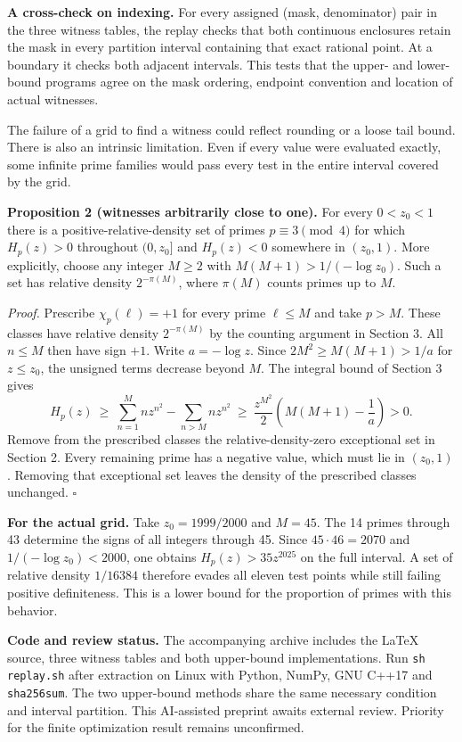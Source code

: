 \documentclass[11pt]{article}
\newcommand{\sechead}[1]{\medskip{\large\bfseries #1}\par}
\begin{document}
\textbf{A cross-check on indexing.} For every assigned (mask, denominator) pair in the three witness tables, the replay checks that both continuous enclosures retain the mask in every partition interval containing that exact rational point. At a boundary it checks both adjacent intervals. This tests that the upper- and lower-bound programs agree on the mask ordering, endpoint convention and location of actual witnesses.
\newpage
\sechead{7. How far out can the first negative witness lie?}
The failure of a grid to find a witness could reflect rounding or a loose tail bound. There is also an intrinsic limitation. Even if every value were evaluated exactly, some infinite prime families would pass every test in the entire interval covered by the grid.

\textbf{Proposition 2 (witnesses arbitrarily close to one).} For every $0<z_0<1$ there is a positive-relative-density set of primes $p\equiv3\pmod4$ for which $H_p(z)>0$ throughout $(0,z_0]$ and $H_p(z)<0$ somewhere in $(z_0,1)$. More explicitly, choose any integer $M\ge2$ with $M(M+1)>1/(-\log z_0)$. Such a set has relative density $2^{-\pi(M)}$, where $\pi(M)$ counts primes up to $M$.

\textit{Proof.} Prescribe $\chi_p(\ell)=+1$ for every prime $\ell\le M$ and take $p>M$. These classes have relative density $2^{-\pi(M)}$ by the counting argument in Section 3. All $n\le M$ then have sign $+1$. Write $a=-\log z$. Since $2M^2\ge M(M+1)>1/a$ for $z\le z_0$, the unsigned terms decrease beyond $M$. The integral bound of Section 3 gives
\[
 H_p(z)\ \ge\ \sum_{n=1}^M n z^{n^2}-\sum_{n>M}n z^{n^2}
 \ \ge\ \frac{z^{M^2}}2\left(M(M+1)-\frac1a\right)>0 .
\]
Remove from the prescribed classes the relative-density-zero exceptional set in Section 2. Every remaining prime has a negative value, which must lie in $(z_0,1)$. Removing that exceptional set leaves the density of the prescribed classes unchanged. $\square$

\textbf{For the actual grid.} Take $z_0=1999/2000$ and $M=45$. The 14 primes through 43 determine the signs of all integers through 45. Since $45\cdot46=2070$ and $1/(-\log z_0)<2000$, one obtains $H_p(z)>35z^{2025}$ on the full interval. A set of relative density $1/16384$ therefore evades all eleven test points while still failing positive definiteness. This is a lower bound for the proportion of primes with this behavior.

\textbf{Code and review status.} The accompanying archive includes the LaTeX source, three witness tables and both upper-bound implementations. Run \texttt{sh replay.sh} after extraction on Linux with Python, NumPy, GNU C++17 and \texttt{sha256sum}. The two upper-bound methods share the same necessary condition and interval partition. This AI-assisted preprint awaits external review. Priority for the finite optimization result remains unconfirmed.
\end{document}
